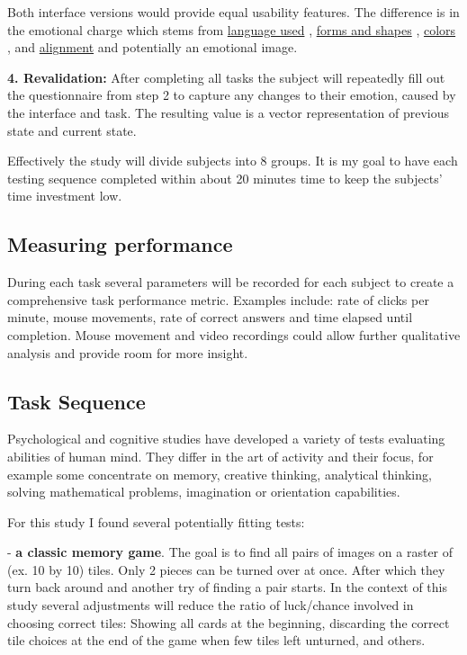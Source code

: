 Both interface versions would provide equal usability features. 
The difference is in the emotional charge which stems from \underline{language used} \cite{Citron2014}, \underline{forms and shapes} \cite{Larson2012, Bertamini2013, Plass2014, Lu2012}, \underline{colors} \cite{Valdez1994, Tekirdag2015, Ou2004} \cite[p.84]{Brave2002}, and \underline{alignment} \cite{Bertamini2013} and potentially an emotional image.

\textbf{4. Revalidation:} After completing all tasks the subject will repeatedly fill out the questionnaire from step 2 to capture any changes to their emotion, caused by the interface and task. The resulting value is a vector representation of previous state and current state.
\vspace{4mm} %

Effectively the study will divide subjects into 8 groups. 
It is my goal to have each testing sequence completed within about 20 minutes time to keep the subjects' time investment low.

\subsection{Measuring performance} \label{measuring}

During each task several parameters will be recorded for each subject to create a comprehensive task performance metric. 
Examples include: rate of clicks per minute, mouse movements, rate of correct answers and time elapsed until completion. 
Mouse movement and video recordings could allow further qualitative analysis and provide room for more insight.

\subsection{Task Sequence} \label{task_sequence}

Psychological and cognitive studies have developed a variety of tests evaluating abilities of human mind. 
They differ in the art of activity and their focus, for example some concentrate on memory, creative thinking, analytical thinking, solving mathematical problems, imagination or orientation capabilities.

For this study I found several potentially fitting tests:

- \textbf{a classic memory game}. The goal is to find all pairs of images on a raster of (ex. 10 by 10) tiles. 
Only 2 pieces can be turned over at once. 
After which they turn back around and another try of finding a pair starts. 
In the context of this study several adjustments will reduce the ratio of luck/chance involved in choosing correct tiles: Showing all cards at the beginning, discarding the correct tile choices at the end of the game when few tiles left unturned, and others.

